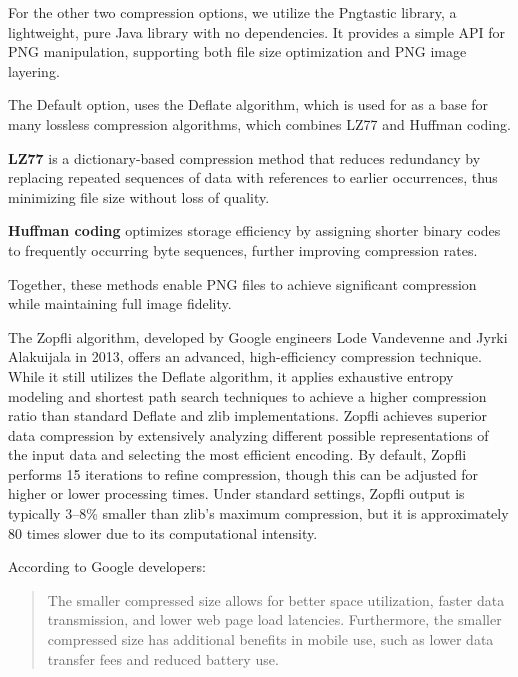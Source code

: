 For the other two compression options, we utilize the Pngtastic library, a lightweight, pure Java library with no dependencies. It provides a simple API for PNG manipulation, supporting both file size optimization and PNG image layering.

The Default option, uses the Deflate algorithm, which is used for as a base for many lossless compression algorithms, which combines LZ77 and Huffman coding.

\begin{compactitem}
\item{}\textbf{LZ77} is a dictionary-based compression method that reduces redundancy by replacing repeated sequences of data with references to earlier occurrences, thus minimizing file size without loss of quality.
\item{}\textbf{Huffman coding} optimizes storage efficiency by assigning shorter binary codes to frequently occurring byte sequences, further improving compression rates.
\end{compactitem}

Together, these methods enable PNG files to achieve significant compression while maintaining full image fidelity.

The Zopfli algorithm, developed by Google engineers Lode Vandevenne and Jyrki Alakuijala in 2013, offers an advanced, high-efficiency compression technique. While it still utilizes the Deflate algorithm, it applies exhaustive entropy modeling and shortest path search techniques to achieve a higher compression ratio than standard Deflate and zlib implementations. Zopfli achieves superior data compression by extensively analyzing different possible representations of the input data and selecting the most efficient encoding. By default, Zopfli performs 15 iterations to refine compression, though this can be adjusted for higher or lower processing times. Under standard settings, Zopfli output is typically 3–8\% smaller than zlib’s maximum compression, but it is approximately 80 times slower due to its computational intensity.

According to Google developers: \cite{ZopfliGoogleBlog}

\begin{quote}
    The smaller compressed size allows for better space utilization, faster data transmission, and lower web page load latencies. Furthermore, the smaller compressed size has additional benefits in mobile use, such as lower data transfer fees and reduced battery use.
\end{quote}

